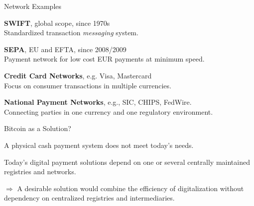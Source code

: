 \documentclass[handout]{beamer}
\begin{document}
\begin{frame}{Network Examples}

\textbf{SWIFT}, global scope, since 1970s\\
Standardized transaction \textit{messaging }system.

\vspace{1em}

\textbf{SEPA}, EU and EFTA, since 2008/2009\\
Payment network for low cost EUR payments at minimum speed.

\vspace{1em}

\textbf{Credit Card Networks}, e.g. Visa, Mastercard\\
Focus on consumer transactions in multiple currencies. 

\vspace{1em}

\textbf{National Payment Networks}, e.g., SIC, CHIPS, FedWire.\\ 
Connecting parties in one currency and one regulatory environment.

\end{frame}

\begin{frame}{Bitcoin as a Solution?}

A physical cash payment system does not meet today's needs.
\vspace{1em}

Today's digital payment solutions depend on one or several centrally maintained registries and networks.
\vspace{1em}

$\Rightarrow$ A desirable solution would combine the efficiency of digitalization without dependency on centralized registries and intermediaries. 
	
\end{frame}
\end{document}
